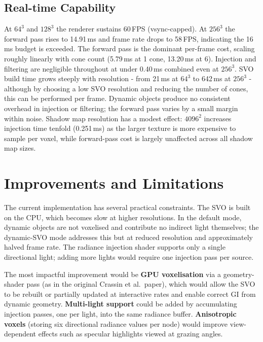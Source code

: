 \documentclass[12pt]{article}
\begin{document}
\subsection{Real-time Capability}

At $64^3$ and $128^3$ the renderer sustains 60\,FPS (vsync-capped). At $256^3$ the forward pass rises to 14.91\,ms and frame rate drops to 58\,FPS, indicating the 16\,ms budget is exceeded. The forward pass is the dominant per-frame cost, scaling roughly linearly with cone count (5.79\,ms at 1 cone, 13.20\,ms at 6). Injection and filtering are negligible throughout at under 0.40\,ms combined even at $256^3$. SVO build time grows steeply with resolution - from 21\,ms at $64^3$ to 642\,ms at $256^3$ - although by choosing a low SVO resolution and reducing the number of cones, this can be performed per frame. Dynamic objects produce no consistent overhead in injection or filtering; the forward pass varies by a small margin within noise. Shadow map resolution has a modest effect: $4096^2$ increases injection time tenfold (0.251\,ms) as the larger texture is more expensive to sample per voxel, while forward-pass cost is largely unaffected across all shadow map sizes.

\section{Improvements and Limitations}

The current implementation has several practical constraints. The SVO is built on the CPU, which becomes slow at higher resolutions. In the default mode, dynamic objects are not voxelised and contribute no indirect light themselves; the dynamic-SVO mode addresses this but at reduced resolution and approximately halved frame rate. The radiance injection shader supports only a single directional light; adding more lights would require one injection pass per source.

The most impactful improvement would be \textbf{GPU voxelisation} via a geometry-shader pass (as in the original Crassin et al.\ paper), which would allow the SVO to be rebuilt or partially updated at interactive rates and enable correct GI from dynamic geometry. \textbf{Multi-light support} could be added by accumulating injection passes, one per light, into the same radiance buffer. \textbf{Anisotropic voxels} (storing six directional radiance values per node) would improve view-dependent effects such as specular highlights viewed at grazing angles.
\end{document}
